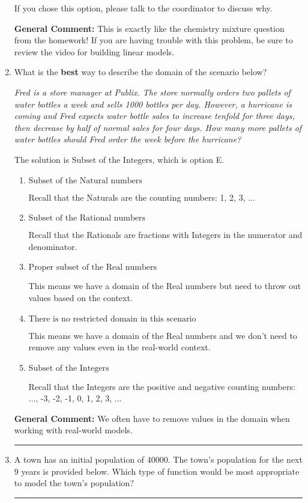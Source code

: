 \documentclass{extbook}[14pt]
\newcommand{\litem}[1]{\item #1

\rule{\textwidth}{0.4pt}}
\begin{document}
\begin{enumerate}
{\begin{enumerate}[label=\Alph*.]
If you chose this option, please talk to the coordinator to discuss why.
\end{enumerate}

\textbf{General Comment:} This is exactly like the chemistry mixture question from the homework! If you are having trouble with this problem, be sure to review the video for building linear models.
}
\litem{
What is the \textbf{best} way to describe the domain of the scenario below?

\begin{center}
    \textit{ Fred is a store manager at Publix. The store normally orders two pallets of water bottles a week and sells 1000 bottles per day. However, a hurricane is coming and Fred expects water bottle sales to increase tenfold for three days, then decrease by half of normal sales for four days. How many more pallets of water bottles should Fred order the week before the hurricane? }
\end{center}
The solution is \( \text{Subset of the Integers} \), which is option E.\begin{enumerate}[label=\Alph*.]
\item \( \text{Subset of the Natural numbers} \)

Recall that the Naturals are the counting numbers: 1, 2, 3, ...
\item \( \text{Subset of the Rational numbers} \)

Recall that the Rationals are fractions with Integers in the numerator and denominator.
\item \( \text{Proper subset of the Real numbers} \)

This means we have a domain of the Real numbers but need to throw out values based on the context.
\item \( \text{There is no restricted domain in this scenario} \)

This means we have a domain of the Real numbers and we don't need to remove any values even in the real-world context.
\item \( \text{Subset of the Integers} \)

Recall that the Integers are the positive and negative counting numbers: ..., -3, -2, -1, 0, 1, 2, 3, ... 
\end{enumerate}

\textbf{General Comment:} We often have to remove values in the domain when working with real-world models.
}
\litem{
A town has an initial population of 40000. The town's population for the next 9 years is provided below. Which type of function would be most appropriate to model the town's population?


}
\end{enumerate}
\end{document}
